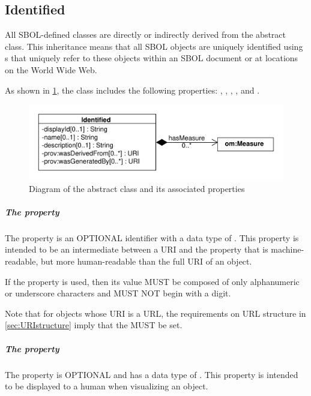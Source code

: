 \subsection{Identified}
\label{sec:Identified}

All SBOL-defined classes are directly or indirectly derived from the   abstract class.
This inheritance means that all SBOL objects are uniquely identified using s that uniquely refer to these objects within an SBOL document or at locations on the World Wide Web.

As shown in \ref{uml:identified}, the  class includes the following properties: ,  , , , and . 

\begin{figure}[ht]
\begin{center}
\includegraphics[scale=0.6]{uml/identified}
\caption[]{Diagram of the  abstract class and its associated properties}
\label{uml:identified}
\end{center}
\end{figure}
  
\subparagraph{The  property}
\label{sec:displayId}
The  property is an OPTIONAL identifier with a data type of . This property is intended to be an intermediate between a URI and the  property that is machine-readable, but more human-readable than the full URI of an object.

If the  property is used, then its  value MUST be composed of only alphanumeric or underscore characters and MUST NOT begin with a digit.

Note that for objects whose URI is a URL, the requirements on URL structure in \ref{sec:URIstructure} imply that the  MUST be set.

\subparagraph{The  property}
\label{sec:name}

The  property is OPTIONAL and has a data type of . This property is intended to be displayed to a human when visualizing an  object.

